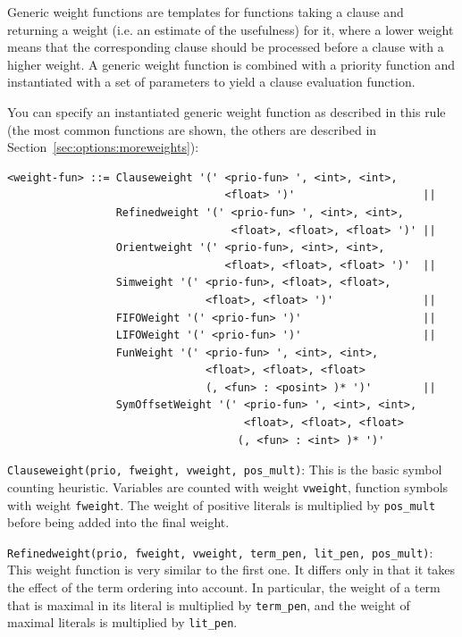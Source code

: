 \documentclass{report}
\begin{document}
Generic weight functions are templates for functions taking a clause
and returning a weight (i.e. an estimate of the usefulness) for it,
where a lower weight means that the corresponding clause should be
processed before a clause with a higher weight.  A generic weight
function is combined with a priority function and instantiated with a
set of parameters to yield a clause evaluation function.

You can specify an instantiated generic weight function as described
in this rule (the most common functions are shown, the others are
described in Section~\ref{sec:options:moreweights}):

\small
\begin{verbatim}
<weight-fun> ::= Clauseweight '(' <prio-fun> ', <int>, <int>,
                                  <float> ')'                    ||
                 Refinedweight '(' <prio-fun> ', <int>, <int>,
                                   <float>, <float>, <float> ')' ||
                 Orientweight '(' <prio-fun>, <int>, <int>,
                                  <float>, <float>, <float> ')'  ||
                 Simweight '(' <prio-fun>, <float>, <float>,
                               <float>, <float> ')'              ||
                 FIFOWeight '(' <prio-fun> ')'                   ||
                 LIFOWeight '(' <prio-fun> ')'                   ||
                 FunWeight '(' <prio-fun> ', <int>, <int>,
                               <float>, <float>, <float>
                               (, <fun> : <posint> )* ')'        ||
                 SymOffsetWeight '(' <prio-fun> ', <int>, <int>,
                                     <float>, <float>, <float>
                                    (, <fun> : <int> )* ')'
\end{verbatim}
\normalsize

\medskip
\noindent{}\texttt{Clauseweight(prio, fweight, vweight, pos\_mult)}:
This is the basic symbol counting heuristic. Variables are counted
with weight \texttt{vweight}, function symbols with weight
\texttt{fweight}. The weight of positive literals is multiplied by
\texttt{pos\_mult} before being added into the final weight.

\medskip
\begin{sloppypar}
\noindent{}\texttt{Refinedweight(prio, fweight, vweight,
    term\_pen, lit\_pen, pos\_mult)}:
This weight function is very similar to the first one. It differs only
in that it takes the effect of the term ordering into account. In
particular, the weight of a term that is maximal in its literal is
multiplied by \texttt{term\_pen}, and the weight of maximal
literals is multiplied by \texttt{lit\_pen}.
\end{sloppypar}
\end{document}
